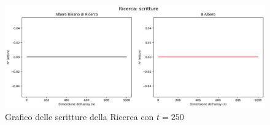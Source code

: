 \begin{figure}[H]
    \centering
    \includegraphics[width=\textwidth]{side-graphs/search-w-t250.png}
    \caption{Grafico delle scritture della Ricerca con $t=250$}
    \label{fig:sidegraphsearchwrite250}
\end{figure}

